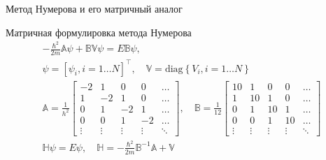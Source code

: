 \documentclass[10pt,pdf,hyperref={unicode},xcolor=dvipsnames]{beamer}
\newcommand{\lsq}{\left[}
\newcommand{\rsq}{\right]}
\newcommand{\bbA}{\mathbb{A}}
\newcommand{\bbB}{\mathbb{B}}
\newcommand{\bbV}{\mathbb{V}}
\newcommand{\bbH}{\mathbb{H}}
\begin{document}
\begin{frame}{Метод Нумерова и его матричный аналог}
    \begin{block}{}
        Матричная формулировка метода Нумерова 
        \begin{gather}
            -\frac{\hbar^2}{2 m} \bbA \psi + \bbB \bbV \psi = E \bbB \psi, \\
            \psi = \lsq \psi_i, i = 1 \dots N \rsq^\top, \quad \bbV = \text{diag} \left\{ V_i, i = 1 \dots N \right\} \\
            \bbA = \frac{1}{h^2} 
            \begin{bmatrix}
                -2 & 1 & 0 & 0 & \dots \\
                 1 &-2 & 1 & 0 & \dots \\ 
                 0 & 1 & -2& 1 & \dots \\
                 0 & 0 & 1 & -2& \dots \\
                 \vdots & \vdots & \vdots & \vdots & \ddots
            \end{bmatrix}, \quad
            \bbB = \frac{1}{12} 
            \begin{bmatrix}
                10 & 1 & 0 & 0 & \dots \\
                1 & 10 & 1 & 0 & \dots \\
                0 & 1 & 10 & 1 & \dots \\
                0 & 0 & 1 & 10 & \dots \\
                \vdots & \vdots & \vdots & \vdots & \ddots
            \end{bmatrix} \\
            \bbH \psi = E \psi, \quad \bbH = -\frac{\hbar^2}{2m} \bbB^{-1} \bbA + \bbV
        \end{gather}
    \end{block}
\end{frame}
\end{document}
